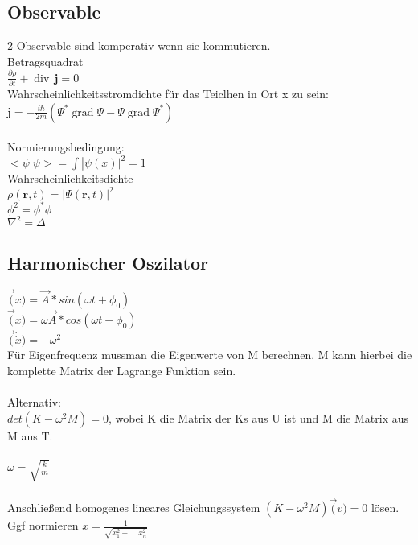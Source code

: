 \documentclass[10pt,a4paper]{article}
\begin{document}
\subsection{Observable}
2 Observable sind komperativ wenn sie kommutieren.\\
%
Betragsquadrat\\
$ \frac{\partial \rho}{\partial t} + \operatorname{div} \, \mathbf{j} = 0$\\
%
  Wahrscheinlichkeitsstromdichte für das Teiclhen in Ort x zu sein:\\
$ \mathbf j = -\frac{i \hbar}{2m}(\Psi^*\operatorname{grad}\Psi - \Psi\operatorname{grad}\Psi^*)$\\
%
\\
Normierungsbedingung:\\
$<\psi|\psi>=\int |\psi(x)|^2=1$\\
 Wahrscheinlichkeitsdichte\\
$\rho(\mathbf r,t)=|\Psi(\mathbf r,t)|^2$\\
%
$\phi^2=\phi^*\phi$\\
$\nabla^2=\Delta$

\subsection{Harmonischer Oszilator}
$\vec(x)=\vec{A}*sin(\omega t + \phi_0)$\\
$\vec(\dot{x})=\omega\vec{A}*cos(\omega t + \phi_0)$\\
$\vec(\dot{\dot{x}})=-\omega^2$\\
%
Für Eigenfrequenz mussman die Eigenwerte von M berechnen. M kann hierbei die komplette Matrix der Lagrange Funktion sein.\\
%
\\
Alternativ:\\
$det(K-\omega^2M)=0$, wobei K die Matrix der Ks aus U ist und M die Matrix aus M aus T.\\
%
\\
$\omega=\sqrt{\frac{k}{m}}$\\
%
\\
Anschließend homogenes lineares Gleichungssystem $(K-\omega^2M)\vec(v)=0$ lösen. Ggf normieren $x=\frac{1}{\sqrt{x^2_1+....x^2_n}}$\\
%
\end{document}
